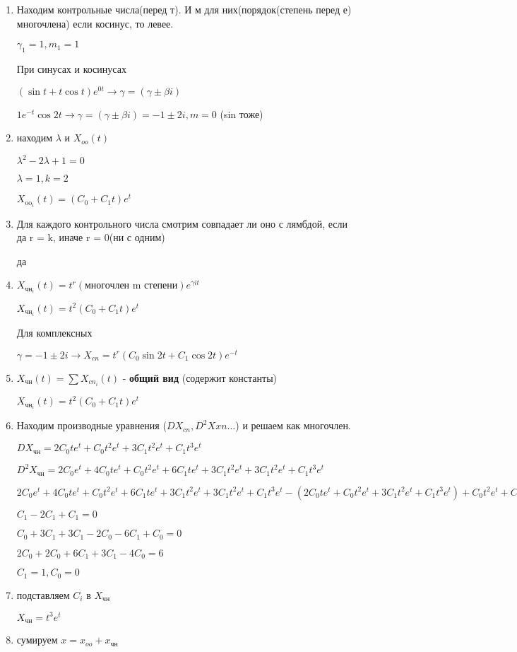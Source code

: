 \documentclass[a4paper, 12pt]{article}
\begin{document}
\begin{enumerate}
    \item Находим контрольные числа(перед т). И м для них(порядок(степень перед е) многочлена) если косинус, то левее.
    
    $\gamma_1=1, m_1=1$

    При синусах и косинусах

    $(\sin t+t\cos t)e^{0t}\rightarrow\gamma=(\gamma\pm\beta i)$

    $1e^{-t}\cos2t\rightarrow\gamma=(\gamma\pm\beta i)=-1\pm2i, m=0$ (sin тоже)
    \item находим $\lambda$ и $X_{oo}(t)$
    
    $\lambda^2-2\lambda+1=0$

    $\lambda=1,k=2$

    $X_{\text{oo}_i}(t)=(C_0+C_1t)e^{t}$
    \item Для каждого контрольного числа смотрим совпадает ли оно с лямбдой, если да r = k, иначе r = 0(ни с одним)
    
    да
    \item $X_{\text{чн}_i}(t)=t^r(\text{многочлен m степени})e^{\gamma it}$
    
    $X_{\text{чн}_i}(t)=t^2(C_0+C_1t)e^{t}$

    Для комплексных

    $\gamma=-1\pm2i\rightarrow X_{cn}=t^r(C_0\sin2t+C_1\cos2t)e^{-t}$

    \item $X_{\text{чн}}(t)=\sum X_{cn_i}(t)$ - \textbf{общий вид} (содержит константы)
    
    $X_{\text{чн}_i}(t)=t^2(C_0+C_1t)e^{t}$
    \item Находим производные уравнения ($DX_{cn}, D^2X{xn}\dots$) и решаем как многочлен.
    
    $DX_{\text{чн}}=2C_0te^t+C_0t^2e^t+3C_1t^2e^t+C_1t^3e^t$

    $D^2X_{\text{чн}}=2C_0e^t+4C_0te^t+C_0t^2e^t+6C_1te^t+3C_1t^2e^t+3C_1t^2e^t+C_1t^3e^t$

    $2C_0e^t+4C_0te^t+C_0t^2e^t+6C_1te^t+3C_1t^2e^t+3C_1t^2e^t+C_1t^3e^t-(2C_0te^t+C_0t^2e^t+3C_1t^2e^t+C_1t^3e^t)+C_0t^2e^t+C_1t^3e^t=6te^t$

    $C_1-2C_1+C_1=0$

    $C_0+3C_1+3C_1-2C_0-6C_1+C_0=0$

    $2C_0+2C_0+6C_1+3C_1-4C_0=6$

    $C_1=1, C_0=0$
    \item подставляем $C_i$ в $X_{\text{чн}}$
    
    $X_{\text{чн}}=t^3e^t$
    \item сумируем $x=x_{oo}+x_{\text{чн}}$
\end{enumerate}
\end{document}
